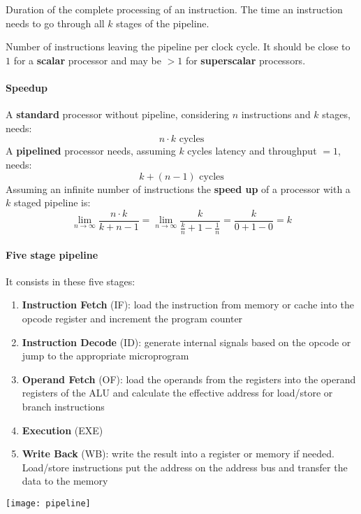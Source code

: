 \begin{definition}[Latency]
	Duration of the complete processing of an instruction. The time an instruction needs to go through	all $k$ stages of the pipeline.
\end{definition}

\begin{definition}[Throughput]
	Number of instructions leaving the pipeline per clock cycle. It should be close to $1$ for a \textbf{scalar} processor and may be $> 1$ for \textbf{superscalar} processors.
\end{definition}

\paragraph{Speedup}
A \textbf{standard} processor without pipeline, considering $n$ instructions and $k$ stages, needs:
\begin{equation}
	n \cdot k \text{ cycles}
\end{equation}
A \textbf{pipelined} processor needs, assuming $k$ cycles latency and throughput $=1$, needs:
\begin{equation}
	k + (n-1) \text{ cycles}
\end{equation}
Assuming an infinite number of instructions the \textbf{speed up} of a processor with a $k$ staged pipeline is:
\begin{equation}
	\lim_{n \to \infty} \frac{n \cdot k}{k+n-1} = \lim_{n \to \infty} \frac{k}{\frac{k}{n}+1-\frac{1}{n}} = \frac{k}{0+1-0} = k
\end{equation}

\paragraph{Five stage pipeline}
It consists in these five stages:
\begin{enumerate}
	\item \textbf{Instruction Fetch} (IF): load the instruction from memory or cache into the opcode register and increment the program counter
	\item \textbf{Instruction Decode} (ID): generate internal signals based on the opcode or jump to the appropriate microprogram
	\item \textbf{Operand Fetch} (OF): load the operands from the registers into the operand registers of the ALU and calculate the effective address for load/store or branch instructions
	\item \textbf{Execution} (EXE)
	\item \textbf{Write Back} (WB): write the result into a register or memory if needed. Load/store instructions put the address on the address bus and transfer the data to the memory
\end{enumerate}
\begin{center}
	\texttt{[image: pipeline]}
\end{center}

